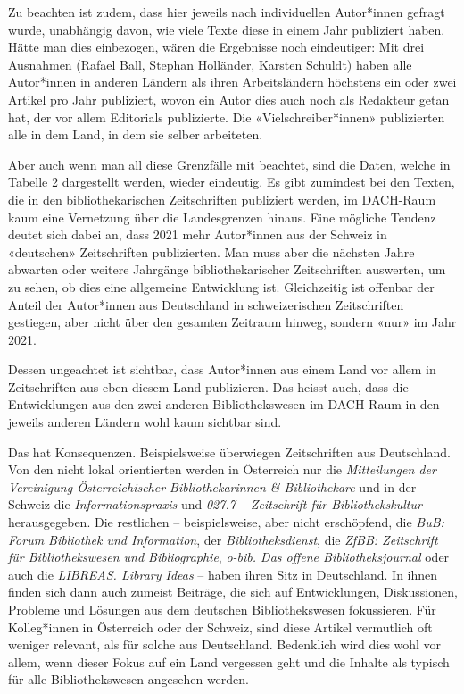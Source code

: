 \documentclass[a4paper,
fontsize=11pt,
oneside,
numbers=noperiodatend,
parskip=half-,
bibliography=totoc,
final
]{scrartcl}
\begin{document}
Zu beachten ist zudem, dass hier jeweils nach individuellen Autor*innen
gefragt wurde, unabhängig davon, wie viele Texte diese in einem Jahr
publiziert haben. Hätte man dies einbezogen, wären die Ergebnisse noch
eindeutiger: Mit drei Ausnahmen (Rafael Ball, Stephan Holländer, Karsten
Schuldt) haben alle Autor*innen in anderen Ländern als ihren
Arbeitsländern höchstens ein oder zwei Artikel pro Jahr publiziert,
wovon ein Autor dies auch noch als Redakteur getan hat, der vor allem
Editorials publizierte. Die «Vielschreiber*innen» publizierten alle in
dem Land, in dem sie selber arbeiteten.

Aber auch wenn man all diese Grenzfälle mit beachtet, sind die Daten,
welche in Tabelle 2 dargestellt werden, wieder eindeutig. Es gibt
zumindest bei den Texten, die in den bibliothekarischen Zeitschriften
publiziert werden, im DACH-Raum kaum eine Vernetzung über die
Landesgrenzen hinaus. Eine mögliche Tendenz deutet sich dabei an, dass
2021 mehr Autor*innen aus der Schweiz in «deutschen» Zeitschriften
publizierten. Man muss aber die nächsten Jahre abwarten oder weitere
Jahrgänge bibliothekarischer Zeitschriften auswerten, um zu sehen, ob
dies eine allgemeine Entwicklung ist. Gleichzeitig ist offenbar der
Anteil der Autor*innen aus Deutschland in schweizerischen Zeitschriften
gestiegen, aber nicht über den gesamten Zeitraum hinweg, sondern «nur»
im Jahr 2021.

Dessen ungeachtet ist sichtbar, dass Autor*innen aus einem Land vor
allem in Zeitschriften aus eben diesem Land publizieren. Das heisst
auch, dass die Entwicklungen aus den zwei anderen Bibliothekswesen im
DACH-Raum in den jeweils anderen Ländern wohl kaum sichtbar sind.

Das hat Konsequenzen. Beispielsweise überwiegen Zeitschriften aus
Deutschland. Von den nicht lokal orientierten werden in Österreich nur
die \emph{Mitteilungen der Vereinigung Österreichischer
Bibliothekarinnen \& Bibliothekare} und in der Schweiz die
\emph{Informationspraxis} und \emph{027.7 -- Zeitschrift für
Bibliothekskultur} herausgegeben. Die restlichen -- beispielsweise, aber
nicht erschöpfend, die \emph{BuB: Forum Bibliothek und Information}, der
\emph{Bibliotheksdienst}, die \emph{ZfBB: Zeitschrift für
Bibliothekswesen und Bibliographie}, \emph{o-bib. Das offene
Bibliotheksjournal} oder auch die \emph{LIBREAS. Library Ideas} -- haben
ihren Sitz in Deutschland. In ihnen finden sich dann auch zumeist
Beiträge, die sich auf Entwicklungen, Diskussionen, Probleme und
Lösungen aus dem deutschen Bibliothekswesen fokussieren. Für
Kolleg*innen in Österreich oder der Schweiz, sind diese Artikel
vermutlich oft weniger relevant, als für solche aus Deutschland.
Bedenklich wird dies wohl vor allem, wenn dieser Fokus auf ein Land
vergessen geht und die Inhalte als typisch für alle Bibliothekswesen
angesehen werden.
\end{document}
